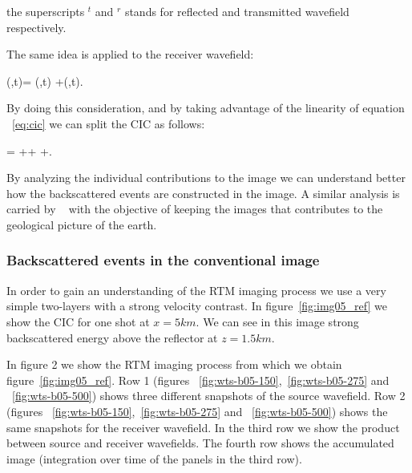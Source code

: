 the superscripts $^t$ and $^r$ stands for reflected and transmitted wavefield respectively. 

The same idea is applied to the receiver wavefield:

\beq
\UR(\xx,t)= \URr(\xx,t) +\URt(\xx,t).
\label{eq:rsplit}
\eeq

By doing this consideration, and by taking advantage of the linearity of equation ~\ref{eq:cic}  we
can split the CIC as follows:

\beq
\R= ++  +.
\label{eq:cicsplit}
\eeq

By analyzing the individual contributions to the image we can understand better how the backscattered events
are constructed in the image. A similar analysis is carried by ~\citep{fei:3130,liu:S29} with the objective
of keeping the images that contributes to the geological picture of the earth.

\subsubsection{Backscattered events in the conventional image}

In order to gain an understanding of the RTM imaging process we use a very simple two-layers with a strong velocity
contrast. In figure~\ref{fig:img05_ref} we show the CIC for one shot at $x=5km$. We can see in this image strong 
backscattered energy above the reflector at $z=1.5km$.

In figure 2 we show the RTM imaging process from which we obtain figure~\ref{fig:img05_ref}. Row 1 
(figures ~\ref{fig:wts-b05-150},~\ref{fig:wts-b05-275} and ~\ref{fig:wts-b05-500}) shows three different snapshots
of the source wavefield. Row 2 (figures ~\ref{fig:wts-b05-150},~\ref{fig:wts-b05-275} and ~\ref{fig:wts-b05-500}) 
shows the same snapshots for the receiver wavefield. In the third row we show the product between
source and receiver wavefields. The fourth row shows the accumulated image (integration over time of the panels
in the third row).


